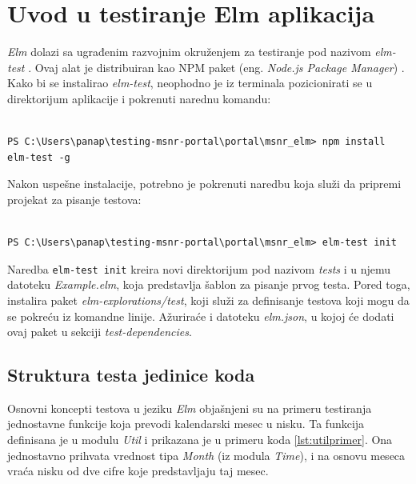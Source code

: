 \documentclass[12pt,oneside]{memoir}
\begin{document}
\section{Uvod u testiranje Elm aplikacija}
\label{sec:uvod-elm}

\par \emph{Elm} dolazi sa ugrađenim razvojnim okruženjem za testiranje pod nazivom \emph{elm-test} \cite{elm-test}. Ovaj alat je distribuiran kao NPM paket (eng. \emph{Node.js Package Manager}) \cite{npm}. Kako bi se instalirao \emph{elm-test}, neophodno je iz terminala pozicionirati se u direktorijum aplikacije i pokrenuti narednu komandu: 

\begin{minipage}{\linewidth}
\begin{lstlisting}[style=DOS]

PS C:\Users\panap\testing-msnr-portal\portal\msnr_elm> npm install elm-test -g

\end{lstlisting}
\end{minipage}

\par Nakon uspešne instalacije, potrebno je pokrenuti naredbu koja služi da pripremi projekat za pisanje testova: 

\begin{minipage}{\linewidth}
\begin{lstlisting}[style=DOS]

PS C:\Users\panap\testing-msnr-portal\portal\msnr_elm> elm-test init

\end{lstlisting}
\end{minipage}

Naredba \texttt{elm-test init} kreira novi direktorijum pod nazivom \emph{tests} i u njemu datoteku \emph{Example.elm}, koja predstavlja šablon za pisanje prvog testa. Pored toga, instalira paket \emph{elm-explorations/test}, koji služi za definisanje testova koji mogu da se pokreću iz komandne linije. Ažuriraće i datoteku \emph{elm.json}, u kojoj će dodati ovaj paket u sekciji \emph{test-dependencies}.

\subsection{Struktura testa jedinice koda}

\par Osnovni koncepti testova u jeziku \emph{Elm} objašnjeni su na primeru testiranja jednostavne funkcije koja prevodi kalendarski mesec u nisku. Ta funkcija definisana je u modulu \emph{Util} i prikazana je u primeru koda \ref{lst:utilprimer}. Ona jednostavno prihvata vrednost tipa \emph{Month} (iz modula \emph{Time}), i na osnovu meseca vraća nisku od dve cifre koje predstavljaju taj mesec.
\end{document}
